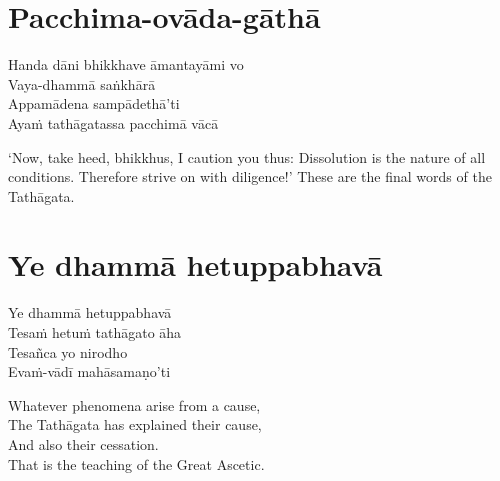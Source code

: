 
\clearpage

\section{Pacchima-ovāda-gāthā}



\begin{paritta}
Handa dāni bhikkhave āmantayāmi vo\\
Vaya-dhammā saṅkhārā\\
Appamādena sampādethā'ti\\
Ayaṁ tathāgatassa pacchimā vācā
\end{paritta}

\begin{english}
  ‘Now, take heed, bhikkhus, I caution you thus: Dissolution is the nature of
  all conditions. Therefore strive on with diligence!’ These are the final words
  of the Tathāgata.
\end{english}


\section{Ye dhammā hetuppabhavā}



\begin{paritta}
  Ye dhammā hetuppabhavā\\
  Tesaṁ hetuṁ tathāgato āha\\
  Tesañca yo nirodho\\
  Evaṁ-vādī mahāsamaṇo'ti
\end{paritta}

\begin{english}
  Whatever phenomena arise from a cause,\\
  The Tathāgata has explained their cause,\\
  And also their cessation.\\
  That is the teaching of the Great Ascetic.
\end{english}


\clearpage


